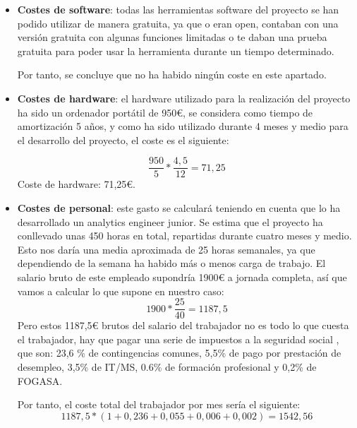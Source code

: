 \begin{itemize}
    \item \textbf{Costes de software}: todas las herramientas software del proyecto se han podido utilizar de manera gratuita, ya que o eran open, contaban con una versión gratuita con algunas funciones limitadas o te daban una prueba gratuita para poder usar la herramienta durante un tiempo determinado.
    
    Por tanto, se concluye que no ha habido ningún coste en este apartado.
    
    \item \textbf{Costes de hardware}: el hardware utilizado para la realización del proyecto ha sido un ordenador portátil de 950€, se considera como tiempo de amortización 5 años, y como ha sido utilizado durante 4 meses y medio para el desarrollo del proyecto, el coste es el siguiente:

    
    \begin{equation}
    \frac{950}{5} * \frac{4,5}{12} = 71,25
    \end{equation}
    Coste de hardware: 71,25€.
    \item \textbf{Costes de personal}: este gasto se calculará teniendo en cuenta que lo ha desarrollado un analytics engineer junior. Se estima que el proyecto ha conllevado unas 450 horas en total, repartidas durante cuatro meses y medio. Esto nos daría una media aproximada de 25 horas semanales, ya que dependiendo de la semana ha habido más o menos carga de trabajo. El salario bruto de este empleado supondría 1900€ a jornada completa, así que vamos a calcular lo que supone en nuestro caso:
    \begin{equation}
    1900 * \frac{25}{40} = 1187,5
    \end{equation}
    Pero estos 1187,5€ brutos del salario del trabajador no es todo lo que cuesta el trabajador, hay que pagar una serie de impuestos a la seguridad social\cite{cotizar} , que son: 23,6 \% de contingencias comunes, 5,5\% de pago por prestación de desempleo, 3,5\% de IT/MS, 0.6\% de formación profesional y 0,2\% de FOGASA.
    
    
    Por tanto, el coste total del trabajador por mes sería el siguiente: 
    \begin{equation}
    1187,5*(1+0,236+0,055+0,006+0,002)= 1542,56 
    \end{equation}
    

\end{itemize}
